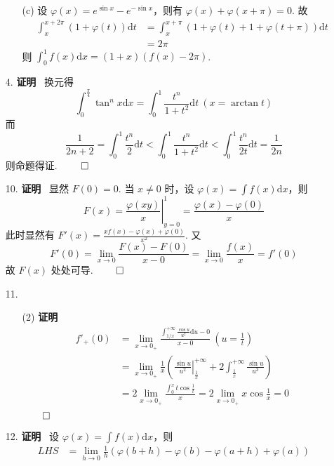 \documentclass[11pt,oneside,fontset=fandol]{ctexbook} %
\begin{document}
\begin{enumerate}
\begin{enumerate}
        \item[(c)]
        设 $\varphi(x) = e^{\sin x} - e^{-\sin x}$，则有 $\varphi(x) + \varphi(x+\pi) = 0$. 故
        \begin{align*}
            \int_x^{x+2\pi} (1 + \varphi(t)) \mathrm dt &= \int_x^{x+\pi} (1 + \varphi(t) + 1 + \varphi(t+\pi)) \mathrm dt \\
            &= 2\pi
        \end{align*}
        则 $\int_0^1 f(x) \mathrm dx = (1 + x)(f(x) - 2\pi)$.
    \end{enumerate}
    \item[4.]
    \textbf{证明} \ 换元得
    \[
        \int_0^{\frac \pi 4} \tan^n x \mathrm dx = \int_0^1 \frac{t^n}{1+t^2} \mathrm dt \ (x = \arctan t)
    \]
    而
    \[
        \frac 1 {2n+2} = \int_0^1 \frac {t^n} 2 \mathrm dt < \int_0^1 \frac{t^n}{1+t^2} \mathrm dt < \int_0^1 \frac{t^n}{2t} \mathrm dt = \frac 1 {2n}
    \]
    则命题得证.
    $\hfill\qed$
    \item[10.]
    \textbf{证明} \ 显然 $F(0) = 0$. 当 $x \neq 0$ 时，设 $\varphi(x) = \int f(x) \mathrm dx$，则
    \[
        F(x) = \left. \frac {\varphi(xy)} x \right|_{y=0}^1 = \frac {\varphi(x) - \varphi(0)} x
    \]
    此时显然有 $F'(x) = \frac{xf(x) - \varphi(x) + \varphi(0)}{x^2}$. 又
    \[
        F'(0) = \lim_{x \to 0} \frac{F(x) - F(0)}{x - 0} = \lim_{x \to 0} \frac {f(x)} x = f'(0)
    \]
    故 $F(x)$ 处处可导.
    $\hfill\qed$
    \item[11.]
    \begin{enumerate}
        \item[(2)]
        \textbf{证明}
        \begin{align*}
            f'_+(0) &= \lim_{x \to 0_+} \frac{\int_{1/x}^{+\infty} \frac{\cos u}{u^2} \mathrm du - 0}{x - 0} \ (u = \frac 1 t) \\
            &= \lim_{x \to 0_+} \frac 1 x \left( \left. \frac{\sin u}{u^2} \right|_{\frac 1 x}^{+\infty} + 2 \int_{\frac 1 x}^{+\infty} \frac{\sin u}{u^3} \right) \\
            &= 2 \lim_{x \to 0_+} \frac{\int_0^x t \cos \frac 1 t}{x} = 2 \lim_{x \to 0_+} x \cos \frac 1 x = 0 \\
        \end{align*}
        $\hfill\qed$
    \end{enumerate}
    \item[12.]
    \textbf{证明} \ 设 $\varphi(x) = \int f(x) \mathrm dx$，则
    \begin{align*}
        LHS &= \lim_{h \to 0} \frac 1 h \left( \varphi(b+h) - \varphi(b) - \varphi(a+h) + \varphi(a) \right) \\

\end{align*}
\end{enumerate}
\end{document}
